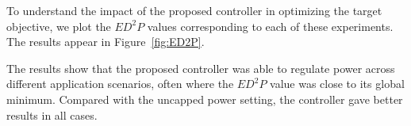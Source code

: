 To understand the impact of the proposed controller in optimizing the target objective, we plot the $ED^2P$ values corresponding to each of these experiments. The results appear in Figure~\ref{fig:ED2P}. 


The results show that the proposed controller was able to regulate power across different application scenarios, often where the $ED^2P$ value was close to its global minimum. Compared with the uncapped power setting, the controller gave better results in all cases.


\newcommand{\bestg}[1]{\cellcolor{green!25}\textbf{#1}}
\newcommand{\worstr}[1]{\cellcolor{red!15}#1}

